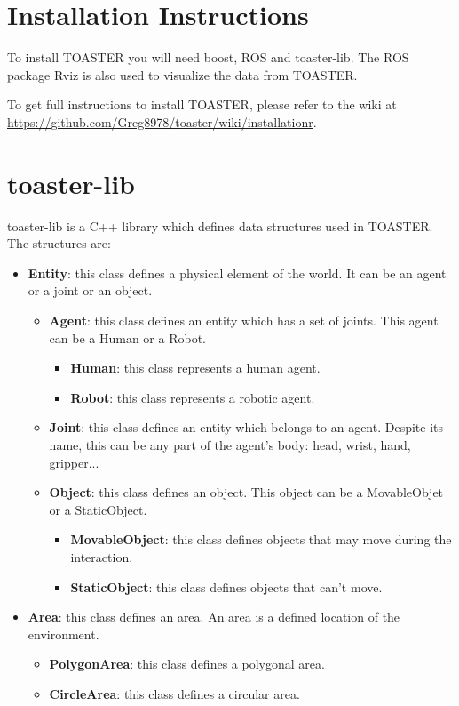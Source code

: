 \documentclass[a4paper]{article}
\begin{document}
\section{Installation Instructions}
To install TOASTER you will need boost, ROS and toaster-lib. The ROS package Rviz is also used to visualize the data from TOASTER.

To get full instructions to install TOASTER, please refer to the wiki at
\url{https://github.com/Greg8978/toaster/wiki/installationr}.

\section{toaster-lib}
toaster-lib is a C++ library which defines data structures used in TOASTER. The structures are:
\begin{itemize}
\item \textbf{Entity}: this class defines a physical element of the world. It can be an agent or a joint or an object.

\begin{itemize}
\setlength{\itemindent}{+.0in}
\item \textbf{Agent}: this class defines an entity which has a set of joints. This agent can be a Human or a Robot.

\begin{itemize}
\item \textbf{Human}: this class represents a human agent.
\item \textbf{Robot}: this class represents a robotic agent.
\end{itemize}


\item \textbf{Joint}: this class defines an entity which belongs to an agent.
Despite its name, this can be any part of the agent's body: head, wrist, hand, gripper...
\item \textbf{Object}: this class defines an object. This object can be a MovableObjet or a StaticObject.

\begin{itemize}
\item \textbf{MovableObject}: this class defines objects that may move during the interaction.

\item \textbf{StaticObject}: this class defines objects that can't move.
\end{itemize}
\end{itemize}



\item \textbf{Area}: this class defines an area. An area is a defined location of the environment.

\begin{itemize}
\item \textbf{PolygonArea}: this class defines a polygonal area.
\item \textbf{CircleArea}: this class defines a circular area.
\end{itemize}
\end{itemize}
\end{document}
